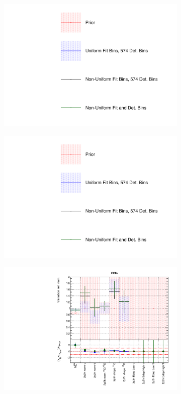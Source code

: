 \begin{figure}[!htbp]
\centering
\begin{subfigure}{0.3\textwidth}
  \centering
  \includegraphics[width=1.0\linewidth,  trim={5mm  80mm 0mm 0mm}, clip]{figs/polyasmvs_leg}
\end{subfigure}
\begin{subfigure}{0.3\textwidth}
  \centering
  \includegraphics[width=1.0\linewidth,  trim={5mm  0mm 0mm 95mm}, clip]{figs/polyasmvs_leg}
\end{subfigure}
\begin{subfigure}{0.49\textwidth}
  \centering
  \includegraphics[width=0.9\linewidth]{figs/polydataxsec_1}

\end{subfigure}
\end{figure}
